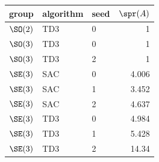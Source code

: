 \begin{tabular}{@{}lllr@{}}
\toprule
group & algorithm & seed & $\spr(A)$ \\
\midrule
$\SO(2)$ & TD3 & 0 & 1 \\
$\SO(3)$ & TD3 & 0 & 1 \\
$\SO(3)$ & TD3 & 2 & 1 \\
$\SE(3)$ & SAC & 0 & 4.006 \\
$\SE(3)$ & SAC & 1 & 3.452 \\
$\SE(3)$ & SAC & 2 & 4.637 \\
$\SE(3)$ & TD3 & 0 & 4.984 \\
$\SE(3)$ & TD3 & 1 & 5.428 \\
$\SE(3)$ & TD3 & 2 & 14.34 \\
\bottomrule
\end{tabular}
